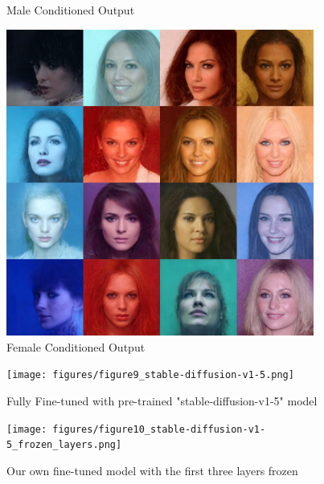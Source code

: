 \documentclass[conference]{IEEEtran}
\begin{document}
\begin{figure}[H]
\begin{minipage}{0.33\textwidth}
    \caption{Male Conditioned Output} \label{fig:male}
   \end{minipage}
   \begin{minipage}{0.33\textwidth}
    \centering
    \includegraphics[width=0.9\textwidth]{figures/figure8_female_cond.png}
    \caption{Female Conditioned Output} \label{fig:female}
   \end{minipage}
\end{figure} \FloatBarrier

\begin{figure}[H]
    \begin{minipage}{0.50\textwidth}
        \centering
        \texttt{[image: figures/figure9\_stable-diffusion-v1-5.png]}
        \caption{Fully Fine-tuned with pre-trained "stable-diffusion-v1-5" model} \label{fig:stable_diff}
    \end{minipage}
    \begin{minipage}{0.50\textwidth}
        \centering
        \texttt{[image: figures/figure10\_stable-diffusion-v1-5\_frozen\_layers.png]}
        \caption{Our own fine-tuned model with the first three layers frozen} \label{fig:stable_diff_frozen}
    \end{minipage}
\end{figure}
\FloatBarrier
\end{document}
